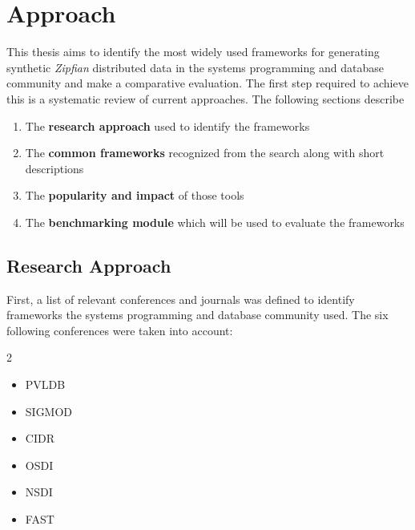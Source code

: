 \chapter{Approach}\label{chapter:approach}

\mytable

\def\printonlypositive#1{\ifnum#1>0
#1
\fi}

This thesis aims to identify the most widely used frameworks for generating synthetic \textit{Zipfian} distributed data in the systems programming and database community and 
make a comparative evaluation.
The first step required to achieve this is a systematic review of current approaches. The following sections describe
\begin{enumerate}
    \item The \textbf{research approach} used to identify the frameworks
    \item The \textbf{common frameworks} recognized from the search along with short descriptions
    \item The \textbf{popularity and impact} of those tools
    \item The \textbf{benchmarking module} which will be used to evaluate the frameworks
\end{enumerate}

\section{Research Approach}
First, a list of relevant conferences and journals was defined to identify frameworks the systems programming and database community used.
 The six following conferences were taken into account:
\begin{center} 
    \begin{minipage}{0.8\linewidth} 
      \begin{multicols}{2} 
        \begin{itemize}
          \raggedright
          \item \ac{PVLDB}
          \item \ac{SIGMOD}
          \item \ac{CIDR}
          \item \ac{OSDI}
          \item \ac{NSDI}
          \item \ac{FAST}
        \end{itemize}
      \end{multicols}
      \label{list:conferences}
    \end{minipage}
\end{center}

